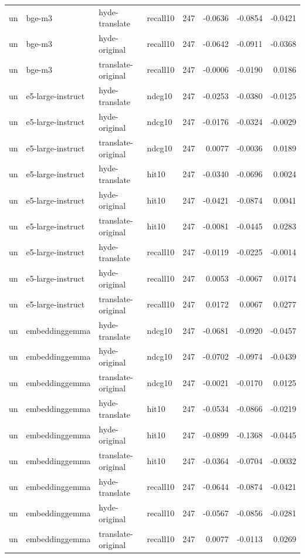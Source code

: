\begin{tabular}{llllrrrr}
un & bge-m3 & hyde-translate & recall10 & 247 & -0.0636 & -0.0854 & -0.0421 \\
un & bge-m3 & hyde-original & recall10 & 247 & -0.0642 & -0.0911 & -0.0368 \\
un & bge-m3 & translate-original & recall10 & 247 & -0.0006 & -0.0190 & 0.0186 \\
un & e5-large-instruct & hyde-translate & ndcg10 & 247 & -0.0253 & -0.0380 & -0.0125 \\
un & e5-large-instruct & hyde-original & ndcg10 & 247 & -0.0176 & -0.0324 & -0.0029 \\
un & e5-large-instruct & translate-original & ndcg10 & 247 & 0.0077 & -0.0036 & 0.0189 \\
un & e5-large-instruct & hyde-translate & hit10 & 247 & -0.0340 & -0.0696 & 0.0024 \\
un & e5-large-instruct & hyde-original & hit10 & 247 & -0.0421 & -0.0874 & 0.0041 \\
un & e5-large-instruct & translate-original & hit10 & 247 & -0.0081 & -0.0445 & 0.0283 \\
un & e5-large-instruct & hyde-translate & recall10 & 247 & -0.0119 & -0.0225 & -0.0014 \\
un & e5-large-instruct & hyde-original & recall10 & 247 & 0.0053 & -0.0067 & 0.0174 \\
un & e5-large-instruct & translate-original & recall10 & 247 & 0.0172 & 0.0067 & 0.0277 \\
un & embeddinggemma & hyde-translate & ndcg10 & 247 & -0.0681 & -0.0920 & -0.0457 \\
un & embeddinggemma & hyde-original & ndcg10 & 247 & -0.0702 & -0.0974 & -0.0439 \\
un & embeddinggemma & translate-original & ndcg10 & 247 & -0.0021 & -0.0170 & 0.0125 \\
un & embeddinggemma & hyde-translate & hit10 & 247 & -0.0534 & -0.0866 & -0.0219 \\
un & embeddinggemma & hyde-original & hit10 & 247 & -0.0899 & -0.1368 & -0.0445 \\
un & embeddinggemma & translate-original & hit10 & 247 & -0.0364 & -0.0704 & -0.0032 \\
un & embeddinggemma & hyde-translate & recall10 & 247 & -0.0644 & -0.0874 & -0.0421 \\
un & embeddinggemma & hyde-original & recall10 & 247 & -0.0567 & -0.0856 & -0.0281 \\
un & embeddinggemma & translate-original & recall10 & 247 & 0.0077 & -0.0113 & 0.0269 \\

\end{tabular}
